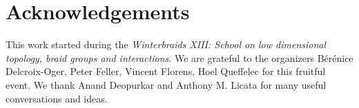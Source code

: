\documentclass{amsart}
\theoremstyle{definition}
\begin{document}

\section*{Acknowledgements}

This work started during the \emph{Winterbraids XIII: School on low dimensional topology, braid groups and interactions}. We are grateful to the organizers Bérénice Delcroix-Oger, Peter Feller, Vincent Florens, Hoel Queffelec for this fruitful event.
We thank Anand Deopurkar and Anthony M. Licata for many useful conversations and ideas.


{}


\label{sec:biblio}
\end{document}
